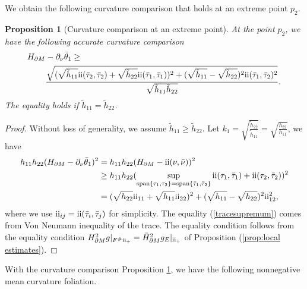 \documentclass[11pt,letterpaper]{amsart}
\newcommand{\RN}[1]{%
  \textup{\uppercase\expandafter{\romannumeral#1}}%
}
\newtheorem{prop}{Proposition}[section]
\begin{document}
We obtain the following curvature comparison that holds at an extreme point $p_{2}$.
\begin{prop} [Curvature comparison at an extreme point] \label{p2curvcomparison}
    At the point $p_2$, we have the following accurate curvature comparison 
    \begin{align}\label{eq: mean curvature comparison}
        H_{\partial M}&-\partial_{\nu}\bar{\theta}_1\geq \\
        \nonumber& \frac{\sqrt{(\sqrt{\tilde{h}_{11}}\RN{2}(\bar{\tau}_2,\bar{\tau}_2)+\sqrt{\tilde{h}_{22}}\RN{2}(\bar{\tau}_1,\bar{\tau}_1))^2+(\sqrt{\tilde{h}_{11}}-\sqrt{\tilde{h}_{22}})^2\RN{2}(\bar{\tau}_1,\bar{\tau}_2)^2}}{\sqrt{\tilde{h}_{11}\tilde{h}_{22}}}.
    \end{align}
    The equality holds if $\tilde{h}_{11} = \tilde{h}_{22}$.
\end{prop}
\begin{proof}
    Without loss of generality, we assume $\tilde{h}_{11}\geq \tilde{h}_{22}$. Let $k_1=\sqrt{\frac{\tilde{h}_{22}}{\tilde{h}_{11}}}=\sqrt{\frac{h_{22}}{h_{11}}}$, we have
    \begin{align}
        \nonumber h_{11}h_{22}(H_{\partial M}-\partial_{\nu}\bar{\theta}_1)^2&= h_{11}h_{22}(H_{\partial M}-\RN{2}(\nu, \bar{\nu}))^2\\ \nonumber & \ge h_{11} h_{22} (\sup_{\text{span} \{\tau_{1}, \tau_{2}\}= \text{span} \{\bar{\tau}_{1}, \bar{\tau}_{2}\}} \RN{2}(\tau_{1},\bar{\tau}_{1}) +\RN{2}(\tau_{2},\bar{\tau}_{2}))^{2} \\ \label{tracesupremum} &=(\sqrt{h_{22}}\RN{2}_{11}+\sqrt{h_{11}}\RN{2}_{22})^2+(\sqrt{h_{11}}-\sqrt{h_{22}})^2\RN{2}_{12}^2,
    \end{align}
    where we use $\RN{2}_{ij}=\RN{2}(\bar{\tau}_i,\bar{\tau}_j)$ for simplicity. The equality (\ref{tracesupremum}) comes from Von Neumann inequality of the trace. The equality condition follows from the equality condition $H_{\partial M}^{2} g|_{F^{\#}\RN{2}_{+}} = \bar{H}_{\partial M}^{2} g_{E}|_{\RN{2}_{+}}$ of Proposition (\ref{prop:local estimates}).
\end{proof}

With the curvature comparison Proposition \ref{p2curvcomparison}, we have the following nonnegative mean curvature foliation.
\end{document}
